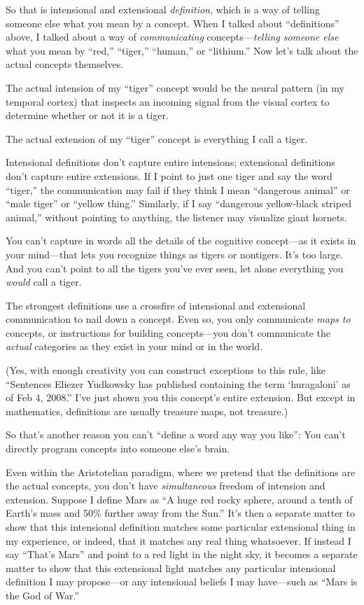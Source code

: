 {
 So that is intensional and extensional \textit{definition}, which
is a way of telling someone else what you mean by a concept. When I
talked about ``definitions'' above,
I talked about a way of \textit{communicating}
concepts---\textit{telling someone else} what you mean by
``red,''
``tiger,''
``human,'' or
``lithium.'' Now
let's talk about the actual concepts themselves.}

{
 The actual intension of my
``tiger'' concept would be the
neural pattern (in my temporal cortex) that inspects an incoming signal
from the visual cortex to determine whether or not it is a tiger.}

{
 The actual extension of my
``tiger'' concept is everything I
call a tiger.}

{
 Intensional definitions don't capture entire
intensions; extensional definitions don't capture
entire extensions. If I point to just one tiger and say the word
``tiger,'' the communication may
fail if they think I mean ``dangerous
animal'' or ``male
tiger'' or ``yellow
thing.'' Similarly, if I say
``dangerous yellow-black striped
animal,'' without pointing to anything, the listener
may visualize giant hornets.}

{
 You can't capture in words all the details of the
cognitive concept---as it exists in your mind---that lets you recognize
things as tigers or nontigers. It's too large. And you
can't point to all the tigers you've
ever seen, let alone everything you \textit{would} call a tiger.}

{
 The strongest definitions use a crossfire of intensional and
extensional communication to nail down a concept. Even so, you only
communicate \textit{maps to} concepts, or instructions for building
concepts---you don't communicate the \textit{actual}
categories as they exist in your mind or in the world.}

{
 (Yes, with enough creativity you can construct exceptions to this
rule, like ``Sentences Eliezer Yudkowsky has published
containing the term `huragaloni' as of
Feb 4, 2008.'' I've just shown you
this concept's entire extension. But except in
mathematics, definitions are usually treasure maps, not treasure.)}

{
 So that's another reason you can't
``define a word any way you like'':
You can't directly program concepts into someone
else's brain.}

{
 Even within the Aristotelian paradigm, where we pretend that the
definitions are the actual concepts, you don't have
\textit{simultaneous} freedom of intension and extension. Suppose I
define Mars as ``A huge red rocky sphere, around a
tenth of Earth's mass and 50\% further away from the
Sun.'' It's then a separate matter to
show that this intensional definition matches some particular
extensional thing in my experience, or indeed, that it matches any real
thing whatsoever. If instead I say
``That's Mars'' and
point to a red light in the night sky, it becomes a separate matter to
show that this extensional light matches any particular intensional
definition I may propose---or any intensional beliefs I may have---such
as ``Mars is the God of War.''}

